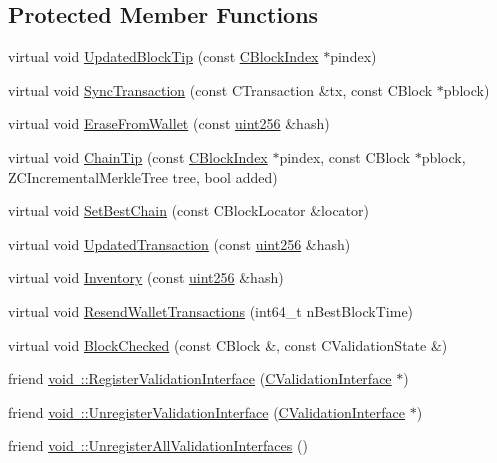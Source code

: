 \subsection*{Protected Member Functions}
\begin{DoxyCompactItemize}
\item 
virtual void \mbox{\hyperlink{class_c_validation_interface_a8cb5e5926b2dbbb25eba8263a6a20542}{Updated\+Block\+Tip}} (const \mbox{\hyperlink{class_c_block_index}{C\+Block\+Index}} $\ast$pindex)
\item 
virtual void \mbox{\hyperlink{class_c_validation_interface_a1d255ed08bf26dbd6ad5924cabfdfae4}{Sync\+Transaction}} (const C\+Transaction \&tx, const C\+Block $\ast$pblock)
\item 
virtual void \mbox{\hyperlink{class_c_validation_interface_af8120f64ec6569dcf765fdf14acef31f}{Erase\+From\+Wallet}} (const \mbox{\hyperlink{classuint256}{uint256}} \&hash)
\item 
virtual void \mbox{\hyperlink{class_c_validation_interface_a15a2ed92f499a9b54c75a594eb0a7702}{Chain\+Tip}} (const \mbox{\hyperlink{class_c_block_index}{C\+Block\+Index}} $\ast$pindex, const C\+Block $\ast$pblock, Z\+C\+Incremental\+Merkle\+Tree tree, bool added)
\item 
virtual void \mbox{\hyperlink{class_c_validation_interface_a8684492d9878120ce8c6c760a790f9ea}{Set\+Best\+Chain}} (const C\+Block\+Locator \&locator)
\item 
virtual void \mbox{\hyperlink{class_c_validation_interface_a8058fc107d993641df615abbb35a4c27}{Updated\+Transaction}} (const \mbox{\hyperlink{classuint256}{uint256}} \&hash)
\item 
virtual void \mbox{\hyperlink{class_c_validation_interface_a981f5160a2370db0cd616c00d8bd5270}{Inventory}} (const \mbox{\hyperlink{classuint256}{uint256}} \&hash)
\item 
virtual void \mbox{\hyperlink{class_c_validation_interface_af501da6f06bccb5e4bfbe66ae1bf6c9d}{Resend\+Wallet\+Transactions}} (int64\+\_\+t n\+Best\+Block\+Time)
\item 
virtual void \mbox{\hyperlink{class_c_validation_interface_aeb34ef6814685cabc29062ed7be25441}{Block\+Checked}} (const C\+Block \&, const C\+Validation\+State \&)
\item 
friend \mbox{\hyperlink{class_c_validation_interface_aa7a5e52b8950b16b3c14391809047ca6}{void \+::\+Register\+Validation\+Interface}} (\mbox{\hyperlink{class_c_validation_interface}{C\+Validation\+Interface}} $\ast$)
\item 
friend \mbox{\hyperlink{class_c_validation_interface_aaed3b260b3de64ed423a9a24bf0e29f4}{void \+::\+Unregister\+Validation\+Interface}} (\mbox{\hyperlink{class_c_validation_interface}{C\+Validation\+Interface}} $\ast$)
\item 
friend \mbox{\hyperlink{class_c_validation_interface_a7234df2b6e1a079260489eea6eb6eb72}{void \+::\+Unregister\+All\+Validation\+Interfaces}} ()
\end{DoxyCompactItemize}


